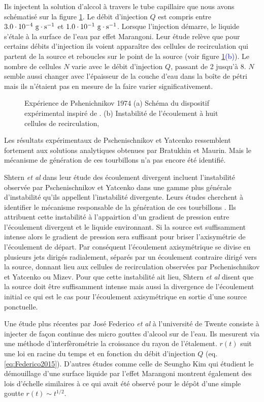   Ils injectent la solution d'alccol à travers le tube capillaire que nous avons schématisé sur la figure \ref{fig:PYfig}. Le débit d'injection $Q$ est compris entre $3.0\cdot 10^{-4}~\rm g\cdot s^{-1}$ et $1.0\cdot 10^{-1}~\rm g\cdot s^{-1}$. Lorsque l'injection démarre, le liquide s'étale à la surface de l'eau par effet Marangoni. Leur étude relève que pour certains débits d'injection ils voient apparaître des cellules de recirculation qui partent de la source et reboucles sur le point de la source (voir figure \ref{fig:PYfig}\textcolor{blue}{(b)}). Le nombre de cellules $N$ varie avec le débit d'injection $Q$, passant de 2 jusqu'à 8. $N$ semble aussi changer avec l'épaisseur de la couche d'eau dans la boîte de pétri mais ils n'étaient pas en mesure de la faire varier significativement.  
\begin{figure}[!ht]
  \centering
  
  \caption{Expérience de Pshenichnikov 1974 \cite{Pshenichnikov1974} (a) Schéma du dispositif expérimental inspiré de \cite{Pshenichnikov1974}. (b) Instabilité de l'écoulement à huit cellules de recirculation, }
  \label{fig:PYfig}
\end{figure}
Les résultats expérimentaux de Pschenischnikov et Yatcenko ressemblent fortement aux solutions analytiques obtenues par Bratukhin et Maurin. Mais le mécanisme de génération de ces tourbillons n'a pas encore été identifié.


Shtern \textit{et al} dans leur étude des écoulement divergent incluent l'instabilité observée par Pschenischnikov et Yatcenko dans une gamme plus générale d'instabilité qu'ils appellent l'instabilité divergente. Leurs études cherchent à identifier le mécanisme responsable de la génération de ces tourbillons \cite{Shtern1993,Shtern1994}. Ils attribuent cette instabilité à l'appairtion d'un gradient de pression entre l'écoulement divergent et le liquide environnant. Si la source est suffisamment intense alors le gradient de pression sera suffisant pour briser l'axisymétrie de l'écoulement de départ. Par conséquent l'écoulement axisymétrique se divise en plusieurs jets dirigés radialement, séparés par un écoulement contraire dirigé vers la source, donnant lieu aux cellules de recirculation observées par Pschenischnikov et Yatcenko ou Mizev. Pour que cette instabilité ait lieu, Shtern \textit{et al} disent que la source doit être suffisamment intense mais aussi la divergence de l'écoulement initial ce qui est le cas pour l'écoulement axisymétrique en sortie d'une source ponctuelle.


Une étude plus récentes par José Federico \textit{et al} à l'université de Twente \cite{Federico2015} consiste à injecter de façon continue des micro gouttes d'alcool sur de l'eau. Ils mesurent via une méthode d'interfèrométrie la croissance du rayon de l'étalement. $r(t)$ suit une loi en racine du temps et en fonction du débit d'injection $Q$ (eq. \eqref{eq:Federico2015}). D'autres études comme celle de Seungho Kim \cite{Kim2019} qui étudient le démouillage d'une surface liquide par l'effet Marangoni montrent également des lois d'échelle similaires à ce qui avait été observé pour le dépôt d'une simple goutte $r(t)\sim t^{1/2}$.

